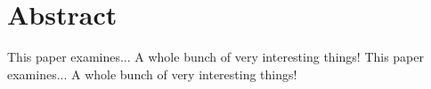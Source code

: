 \section{Abstract}

\noindent This paper examines... A whole bunch of very interesting things! \lipsum[1]
\noindent This paper examines... A whole bunch of very interesting things! \lipsum[1]
